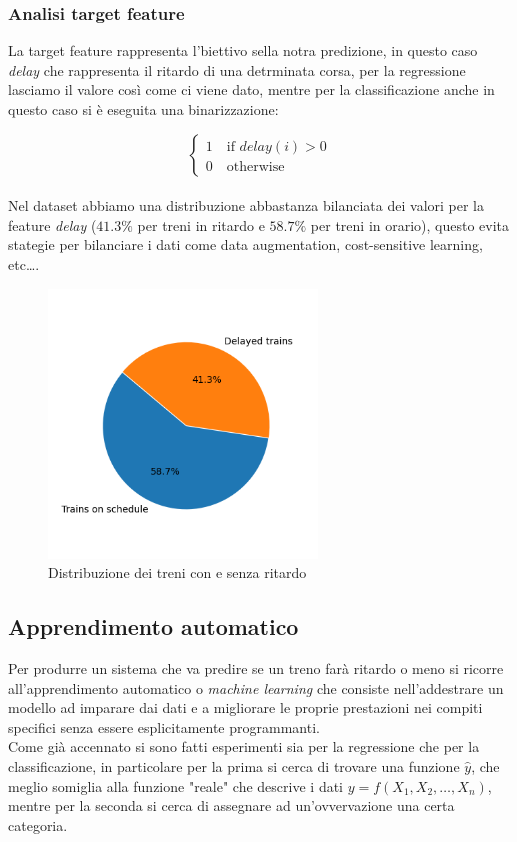 \documentclass[italian,12pt,a4paper]{article}
\begin{document}
		\subsubsection{Analisi target feature}
			La target feature rappresenta l'biettivo sella notra predizione, in questo caso \textit{delay} che rappresenta il ritardo di una detrminata corsa, per la regressione lasciamo il valore così come ci viene dato, mentre per la classificazione anche in questo caso si è eseguita una binarizzazione:
			
			\begin{equation*}
				\begin{cases}
					1 \quad \text{if } delay(i) > 0  \\
					0 \quad \text{otherwise}
				\end{cases}
			\end{equation*}
			\linebreak
			\\
			Nel dataset abbiamo una distribuzione abbastanza bilanciata dei valori per la feature \textit{delay} ($41.3\%$ per treni in ritardo e $58.7\%$ per treni in orario), questo evita stategie per bilanciare i dati come data augmentation, cost-sensitive learning, etc\dots.
			
			\begin{figure}[!h]
				\centering
				\includegraphics[width=270px]{img/delay_graph}
				\caption{Distribuzione dei treni con e senza ritardo}
			\end{figure}
			
	\subsection{Apprendimento automatico}
	Per produrre un sistema che va predire se un treno farà ritardo o meno si ricorre all'apprendimento automatico o \textit{machine learning} che consiste nell'addestrare un modello ad imparare dai dati e a migliorare le proprie prestazioni nei compiti specifici senza essere esplicitamente programmanti.\\
	Come già accennato si sono fatti esperimenti sia per la regressione che per la classificazione, in particolare per la prima si cerca di trovare una funzione $\hat{y}$, che meglio somiglia alla funzione "reale" che descrive i dati $y = f(X_1, X_2, \dots, X_n)$, mentre per la seconda si cerca di assegnare ad un'ovvervazione una certa categoria.
\end{document}

